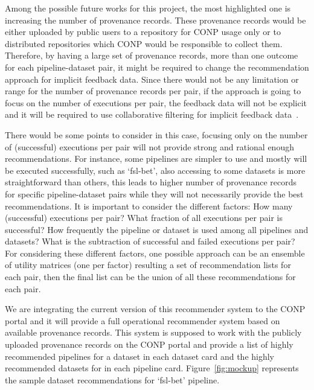 Among the possible future works for this project, the most highlighted one is increasing the number of provenance records. These provenance records would be either uploaded by public users to a repository for CONP usage only or to distributed repositories which CONP would be responsible to collect them. Therefore, by having a large set of provenance records, more than one outcome for each pipeline-dataset pair, it might be required to change the recommendation approach for implicit feedback data. 
Since there would not be any limitation or range for the number of provenance records per pair, if the approach is going to focus on the number of executions per pair, the feedback data will not be explicit and it will be required to use collaborative filtering for implicit feedback data~\cite{hu2008collaborative}.

There would be some points to consider in this case, focusing only on the number of (successful) executions per pair will not provide strong and rational enough recommendations. For instance, some pipelines are simpler to use and mostly will be executed successfully, such as `fsl-bet', also accessing to some datasets is more straightforward than others, this leads to higher number of provenance records for specific pipeline-dataset pairs while they will not necessarily provide the best recommendations. It is important to consider the different factors: How many (successful) executions per pair? What fraction of all executions per pair is successful? How frequently the pipeline or dataset is used among all pipelines and datasets? What is the subtraction of successful and failed executions per pair? For considering these different factors, one possible approach can be an ensemble of utility matrices (one per factor) resulting a set of recommendation lists for each pair, then the final list can be the union of all these recommendations for each pair.

We are integrating the current version of this recommender system to the CONP portal and it will provide a full operational recommender system based on available provenance records. This system is supposed to work with the publicly uploaded provenance records on the CONP portal and provide a list of highly recommended pipelines for a dataset in each dataset card and the highly recommended datasets for in each pipeline card. Figure~\ref{fig:mockup} represents the sample dataset recommendations for `fsl-bet' pipeline.

